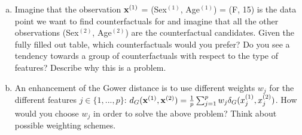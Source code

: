 {\begin{enumerate}[a)]
\item
Imagine that the observation $\mathbf{x}^{(1)}$ = (Sex$^{(1)}$, Age$^{(1)}$) = (F, 15) is the data point we want to
find counterfactuals for and imagine that all the other observations (Sex$^{(2)}$, Age$^{(2)}$)
are the counterfactual candidates.
Given the fully filled out table, which counterfactuals would you prefer?
Do you see a tendency towards a group of counterfactuals with respect to the
type of features? Describe why this is a problem.

\item
An enhancement of the Gower distance is to use different weights $w_j$ for the
different features $j \in \{1, ..., p\}$:
$ d_G(\mathbf{x}^{(1)}, \mathbf{x}^{(2)}) =  \frac{1}{p}\sum_{j = 1}^{p} w_j \delta_G(x_j^{(1)}, x_j^{(2)})$.
How would you choose $w_j$ in order to solve the above problem?
Think about possible weighting schemes.

\end{enumerate}
}
